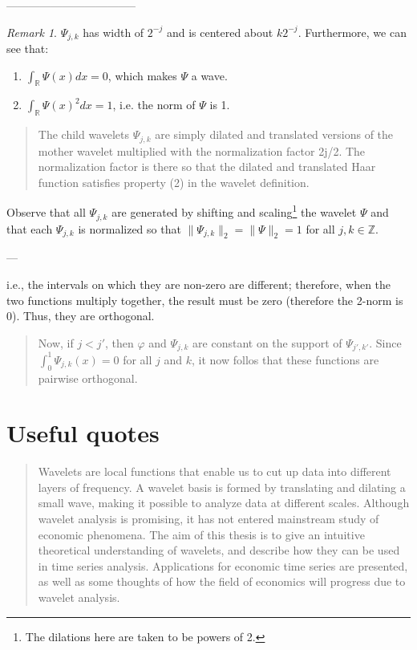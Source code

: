 \documentclass[11pt]{amsart}
\theoremstyle{theorem} %
\theoremstyle{definition}
\theoremstyle{example}
\theoremstyle{remark}
\newtheorem{rem}[thm]{Remark}
\numberwithin{equation}{section}
\newcommand{\R}{\mathbb{R}}
\newcommand{\Z}{\mathbb{Z}}
\begin{document}
	
-----------------------------------

\begin{rem}
	$ \varPsi_{j,k} $ has width of $ 2^{-j} $ and is centered about $ k 2^{-j} $. Furthermore, we can see that:
	\begin{enumerate}
		\item $ \int_{\R} \varPsi(x)dx = 0 $, which makes $ \varPsi $ a wave.
		\item  $ \int_{\R} \varPsi(x)^2dx = 1 $, i.e. the norm of $ \varPsi $ is 1.
	\end{enumerate}
\end{rem}	

\begin{quote}
	The child wavelets $ \varPsi_{j,k} $ are simply dilated and translated versions of the mother wavelet multiplied with the normalization factor 2j/2. The normalization factor is there so that the dilated and translated Haar function satisfies property (2) in the wavelet	definition.
\end{quote}

Observe that all $ \varPsi_{j,k} $ are generated by shifting and scaling\footnote{The dilations here are taken to be powers of 2.} the wavelet $ \varPsi $ and that each $ \varPsi_{j,k} $ is normalized so that $ \| \varPsi_{j,k}\|_2 = \|\varPsi\|_2 = 1 $ for all $ j,k \in \Z $.

---

i.e., the intervals on which they are non-zero are different; therefore, when the two functions multiply together, the result must be zero (therefore the 2-norm is 0). Thus, they are orthogonal. 
\begin{quote}
	Now, if $ j < j' $, then $ \varphi $ and $ \varPsi_{j,k} $ are constant on the support of $ \varPsi_{j',k'} $. Since $ \int_0^1 \varPsi_{j,k}(x) = 0 $ for all $ j $ and $ k $, it now follos that these functions are pairwise orthogonal.
\end{quote}

\section{Useful quotes}
\begin{quote}
	Wavelets are local functions that enable us to cut up data into different layers of frequency. A wavelet basis is formed by translating and dilating a small wave, making it
	possible to analyze data at different scales. Although wavelet analysis is promising, it
	has not entered mainstream study of economic phenomena. The aim of this thesis is to
	give an intuitive theoretical understanding of wavelets, and describe how they can be
	used in time series analysis. Applications for economic time series are presented, as well
	as some thoughts of how the field of economics will progress due to wavelet analysis.
\end{quote}
\end{document}
